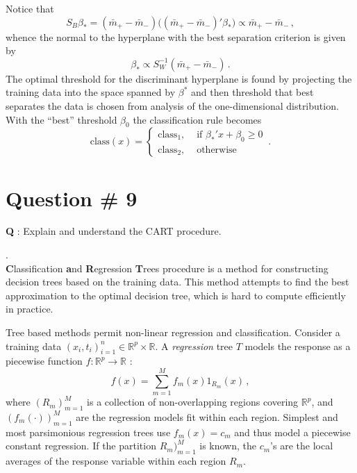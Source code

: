 \documentclass[a4paper]{article}
\newcommand{\Real}{\mathbb{R}}
\begin{document}
Notice that
\[
S_B \beta_* = (\bar{m}_+ - \bar{m}_-) \bigl( (\bar{m}_+ - \bar{m}_-)'\beta_* \bigr)
\propto \bar{m}_+ - \bar{m}_-\,,
\]
whence the normal to the hyperplane with the best separation criterion is given by
\[ \beta_* \propto S_W^{-1} (\bar{m}_+ - \bar{m}_-) \,. \]
The optimal threshold for the discriminant hyperplane is found by projecting the 
training data into the space spanned by $\beta^*$ and then threshold that best
separates the data is chosen from analysis of the one-dimensional distribution.
With the ``best'' threshold $\beta_0$ the classification rule becomes
\[\text{class}(x) = \begin{cases}
	\text{class}_1, &\text{ if } \beta_*' x + \beta_0 \geq 0\\
	\text{class}_2, &\text{ otherwise }
\end{cases}\,.\]

\clearpage

\section[CART]{Question \# 9} %
\label{sec:question_9}
\textbf{\large \textbf{Q}} : Explain and understand the CART procedure.

 .\hfill\\
\textbf{C}lassification \textbf{a}nd \textbf{R}egression \textbf{T}rees procedure
is a method for constructing decision trees based on the training data. This method
attempts to find the best approximation to the optimal decision tree, which is hard
to compute efficiently in practice.

Tree based methods permit non-linear regression and classification. Consider a training
data $(x_i,t_i)_{i=1}^n\in \Real^p \times \Real$. A \emph{regression} tree $T$ models
the response as a piecewise function $f:\Real^p \to \Real$ :
\[ f(x) = \sum_{m=1}^M f_m(x) 1_{R_m}(x)\,, \]
where $(R_m)_{m=1}^M$ is a collection of non-overlapping regions covering $\Real^p$, 
and $(f_m(\cdot))_{m=1}^M$ are the regression models fit within each region. Simplest
and most parsimonious regression trees use $f_m(x) = c_m$ and thus model a piecewise
constant regression. If the partition $R_m)_{m=1}^M$ is known, the $c_m$'s are the
local averages of the response variable within each region $R_m$.
\end{document}
